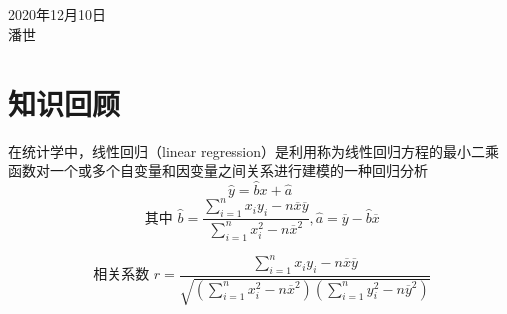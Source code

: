 \documentclass[UTF8]{article}
\begin{document}
   
\begin{center}
{}
\\ \hspace*{\fill} \\ 2020年12月10日 
\\潘世\\
\end{center}
\section{知识回顾}  
在统计学中，线性回归（linear regression）是利用称为线性回归方程的最小二乘函数对一个或多个自变量和因变量之间关系进行建模的一种回归分析\\
$$\hat { y } = \hat { b } x + \hat { a }$$ 
$$\text { 其中 }\hat { b } = \frac { \sum\limits _ { i = 1 } ^ { n } x _ { i } y _ { i } - n \overline { x } \overline { y } } { \sum \limits_ { i = 1 } ^ { n } x _ { i } ^ { 2 } - n \overline { x } ^ { 2 } } , \hat { a } = \overline { y } - \hat { b } \overline { x }$$

$$\text { 相关系数 }r = \frac { \sum \limits_ { i = 1 } ^ { n } x _ { i } y _ { i } - n \overline { x } \overline { y } } { \sqrt { ( \sum \limits_ { i = 1 } ^ { n } x _ { i } ^ { 2 } - n \overline { x } ^ { 2 } ) ( \sum \limits_ { i = 1 } ^ { n } y _ { i } ^ { 2 } - n \overline { y } ^ { 2 } ) } } $$
\\
\end{document}
